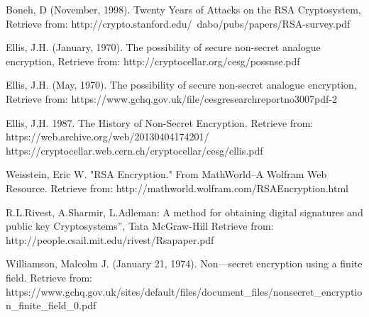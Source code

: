 \documentclass[conference,compsoc, 10pt]{IEEEtran}
\begin{document}
\large
\begin{thebibliography}{1}
Boneh, D (November, 1998). Twenty Years of Attacks on the RSA Cryptosystem, Retrieve from: http://crypto.stanford.edu/~dabo/pubs/papers/RSA-survey.pdf

Ellis, J.H. (January, 1970). The possibility of secure non-secret analogue encryption, Retrieve from: http://cryptocellar.org/cesg/possnse.pdf

Ellis, J.H. (May, 1970). The possibility of secure non-secret analogue encryption, Retrieve from: https://www.gchq.gov.uk/file/cesgresearchreportno3007pdf-2

Ellis, J.H. 1987. The History of Non-Secret Encryption. Retrieve from: https://web.archive.org/web/20130404174201/\newline
https://cryptocellar.web.cern.ch/cryptocellar/cesg/ellis.pdf

Weisstein, Eric W. "RSA Encryption." From MathWorld--A Wolfram Web Resource. Retrieve from: http://mathworld.wolfram.com/RSAEncryption.html

R.L.Rivest, A.Sharmir, L.Adleman: A method for obtaining digital signatures and public key Cryptosystems”, Tata McGraw-Hill Retrieve from: http://people.csail.mit.edu/rivest/Rsapaper.pdf

Williamson, Malcolm J. (January 21, 1974). Non—secret encryption using a finite field. Retrieve from:
https://www.gchq.gov.uk/sites/default/files/document\_files/\newline nonsecret\_encryption\_finite\_field\_0.pdf

\end{thebibliography}
\end{document}
